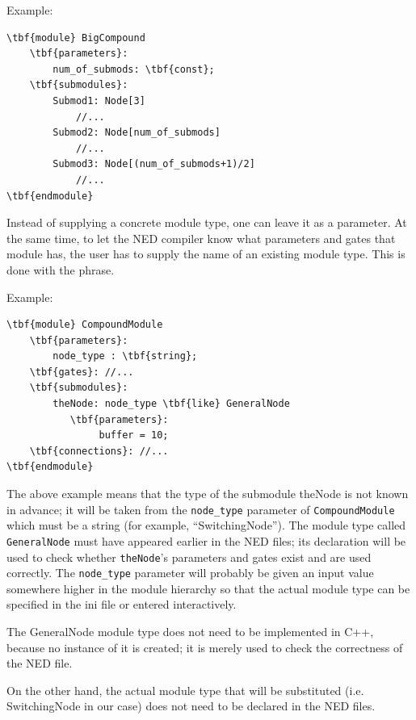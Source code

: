 Example:

\begin{Verbatim}[commandchars=\\\{\}]
\tbf{module} BigCompound
    \tbf{parameters}:
        num_of_submods: \tbf{const};
    \tbf{submodules}:
        Submod1: Node[3]
            //...
        Submod2: Node[num_of_submods]
            //...
        Submod3: Node[(num_of_submods+1)/2]
            //...
\tbf{endmodule}
\end{Verbatim}



Instead of supplying a concrete module type, one can leave it as a
parameter. At the same time, to let the NED compiler know what
parameters and gates that module has, the user has to supply the name
of an existing module type. This is done with the
 phrase.

Example:


\begin{Verbatim}[commandchars=\\\{\}]
\tbf{module} CompoundModule
    \tbf{parameters}:
        node_type : \tbf{string};
    \tbf{gates}: //...
    \tbf{submodules}:
        theNode: node_type \tbf{like} GeneralNode
           \tbf{parameters}:
                buffer = 10;
    \tbf{connections}: //...
\tbf{endmodule}
\end{Verbatim}

The above example means that the type of the submodule theNode is not
known in advance; it will be taken from the \texttt{node\_type}
parameter of \texttt{CompoundModule} which must be a string (for
example, ``SwitchingNode''). The module type called
\texttt{GeneralNode} must have appeared earlier in the NED files; its
declaration will be used to check whether \texttt{theNode}'s
parameters and gates exist and are used correctly. The
\texttt{node\_type} parameter will probably be given an input value
somewhere higher in the module hierarchy so that the actual module
type can be specified in the ini file or entered interactively.

The GeneralNode module type does not need to be implemented in
C++, because no instance of it is created; it is merely used
to check the correctness of the NED file.

On the other hand, the actual module type that will be substituted
(i.e. SwitchingNode in our case) does not need to be declared
in the NED files.

